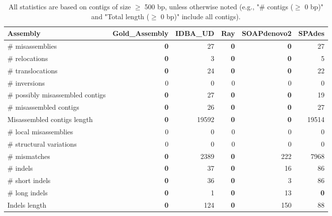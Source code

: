 \documentclass[12pt,a4paper]{article}
\begin{document}
\begin{table}[ht]
\begin{center}
\caption{All statistics are based on contigs of size $\geq$ 500 bp, unless otherwise noted (e.g., "\# contigs ($\geq$ 0 bp)" and "Total length ($\geq$ 0 bp)" include all contigs).}
\begin{tabular}{|l*{5}{|r}|}
\hline
Assembly & Gold\_Assembly & IDBA\_UD & Ray & SOAPdenovo2 & SPAdes \\ \hline
\# misassemblies & {\bf 0} & 27 & {\bf 0} & {\bf 0} & 27 \\ \hline
\hspace{5mm}\# relocations & {\bf 0} & 3 & {\bf 0} & {\bf 0} & 5 \\ \hline
\hspace{5mm}\# translocations & {\bf 0} & 24 & {\bf 0} & {\bf 0} & 22 \\ \hline
\hspace{5mm}\# inversions & 0 & 0 & 0 & 0 & 0 \\ \hline
\# possibly misassembled contigs & {\bf 0} & 27 & {\bf 0} & {\bf 0} & 19 \\ \hline
\# misassembled contigs & {\bf 0} & 26 & {\bf 0} & {\bf 0} & 27 \\ \hline
Misassembled contigs length & {\bf 0} & 19592 & {\bf 0} & {\bf 0} & 19514 \\ \hline
\# local misassemblies & 0 & 0 & 0 & 0 & 0 \\ \hline
\# structural variations & 0 & 0 & 0 & 0 & 0 \\ \hline
\# mismatches & {\bf 0} & 2389 & {\bf 0} & 222 & 7968 \\ \hline
\# indels & {\bf 0} & 37 & {\bf 0} & 16 & 86 \\ \hline
\hspace{5mm}\# short indels & {\bf 0} & 36 & {\bf 0} & 3 & 86 \\ \hline
\hspace{5mm}\# long indels & {\bf 0} & 1 & {\bf 0} & 13 & {\bf 0} \\ \hline
Indels length & {\bf 0} & 124 & {\bf 0} & 150 & 88 \\ \hline
\end{tabular}
\end{center}
\end{table}
\end{document}
